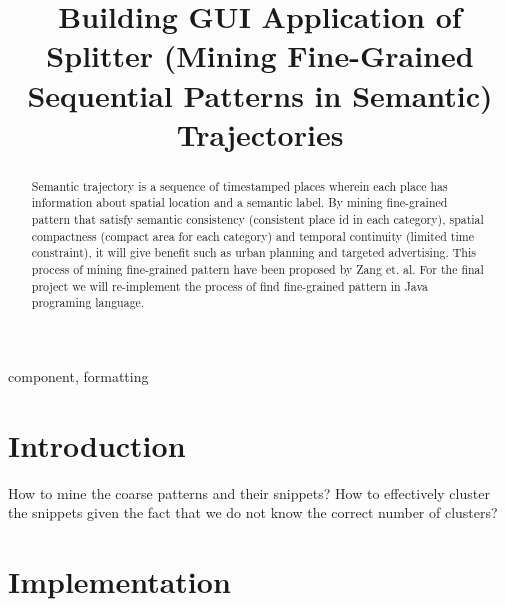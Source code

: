 \documentclass[conference]{IEEEtran}
\begin{document}
\title{Building GUI Application of Splitter (Mining Fine-Grained Sequential Patterns in Semantic)
Trajectories\\
}

\author{
}

\maketitle

\begin{abstract}
Semantic trajectory is a sequence of timestamped places wherein each place has information about spatial location and a semantic label. By mining fine-grained pattern that satisfy semantic consistency (consistent place id in each category), spatial compactness (compact area for each category) and temporal continuity (limited time constraint), it will give benefit such as urban planning and targeted advertising. This process of mining fine-grained pattern have been proposed by Zang et. al. For the final project we will re-implement the process of find fine-grained pattern in Java programing language.
\end{abstract}

\begin{IEEEkeywords}
component, formatting
\end{IEEEkeywords}

\section{Introduction}
How to mine the coarse patterns and their snippets?
How to effectively cluster the snippets given the fact that we do not know the correct number of clusters?


\section{Implementation}
\end{document}
